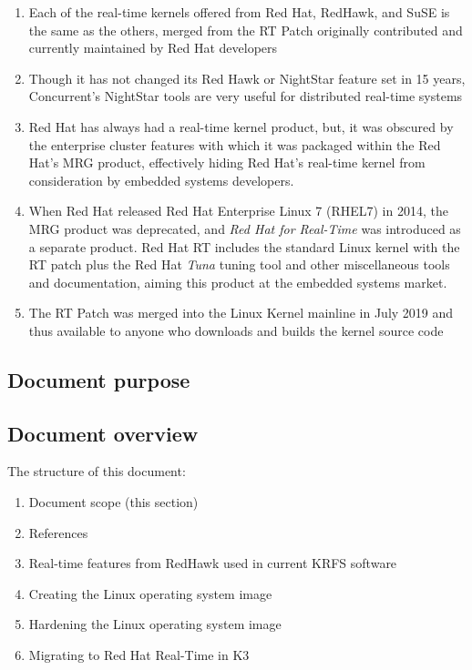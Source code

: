 \documentclass[12pt]{article}
\begin{document}
\begin{enumerate}
    \item Each of the real-time kernels offered from Red Hat, RedHawk, and SuSE
is the same as the others, merged from the RT Patch originally contributed and
currently maintained by Red Hat developers
    \item Though it has not changed its Red Hawk or NightStar feature set in 15
years, Concurrent's NightStar tools are very useful for distributed real-time
systems
    \item Red Hat has always had a real-time kernel product, but, it was
obscured by the enterprise cluster features with which it was packaged within
the Red Hat's MRG product, effectively hiding Red Hat's real-time kernel from
consideration by embedded systems developers.
    \item When Red Hat released Red Hat Enterprise Linux 7 (RHEL7) in 2014, the
MRG product was deprecated, and \emph{Red Hat for Real-Time} was introduced as a
separate product.  Red Hat RT includes the standard Linux kernel with the RT
patch plus the Red Hat \emph{Tuna} tuning tool and other miscellaneous tools and
documentation, aiming this product at the embedded systems market.
    \item The RT Patch was merged into the Linux Kernel mainline in July 2019
and thus available to anyone who downloads and builds the kernel source code
\end{enumerate}



\subsection{Document purpose}
%


\subsection{Document overview}
The structure of this document:

\begin{enumerate}
    \item Document scope (this section)
    \item References
    \item Real-time features from RedHawk used in current KRFS software
    \item Creating the Linux operating system image
    \item Hardening the Linux operating system image
    \item Migrating to Red Hat Real-Time in K3
\end{enumerate}
\end{document}

